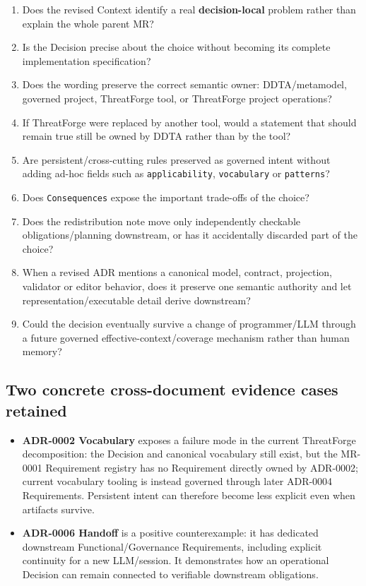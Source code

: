 \documentclass[
  10pt,
]{article}
\providecommand{\tightlist}{%
  \setlength{\itemsep}{0pt}\setlength{\parskip}{0pt}}
\begin{document}
\begin{enumerate}
\def\labelenumi{\arabic{enumi}.}
\tightlist
\item
  Does the revised Context identify a real \textbf{decision-local}
  problem rather than explain the whole parent MR?
\item
  Is the Decision precise about the choice without becoming its complete
  implementation specification?
\item
  Does the wording preserve the correct semantic owner: DDTA/metamodel,
  governed project, ThreatForge tool, or ThreatForge project operations?
\item
  If ThreatForge were replaced by another tool, would a statement that
  should remain true still be owned by DDTA rather than by the tool?
\item
  Are persistent/cross-cutting rules preserved as governed intent
  without adding ad-hoc fields such as \texttt{applicability},
  \texttt{vocabulary} or \texttt{patterns}?
\item
  Does \texttt{Consequences} expose the important trade-offs of the
  choice?
\item
  Does the redistribution note move only independently checkable
  obligations/planning downstream, or has it accidentally discarded part
  of the choice?
\item
  When a revised ADR mentions a canonical model, contract, projection,
  validator or editor behavior, does it preserve one semantic authority
  and let representation/executable detail derive downstream?
\item
  Could the decision eventually survive a change of programmer/LLM
  through a future governed effective-context/coverage mechanism rather
  than human memory?
\end{enumerate}

\subsection{Two concrete cross-document evidence cases
retained}\label{two-concrete-cross-document-evidence-cases-retained}

\begin{itemize}
\tightlist
\item
  \textbf{ADR-0002 Vocabulary} exposes a failure mode in the current
  ThreatForge decomposition: the Decision and canonical vocabulary still
  exist, but the MR-0001 Requirement registry has no Requirement
  directly owned by ADR-0002; current vocabulary tooling is instead
  governed through later ADR-0004 Requirements. Persistent intent can
  therefore become less explicit even when artifacts survive.
\item
  \textbf{ADR-0006 Handoff} is a positive counterexample: it has
  dedicated downstream Functional/Governance Requirements, including
  explicit continuity for a new LLM/session. It demonstrates how an
  operational Decision can remain connected to verifiable downstream
  obligations.
\end{itemize}
\end{document}
